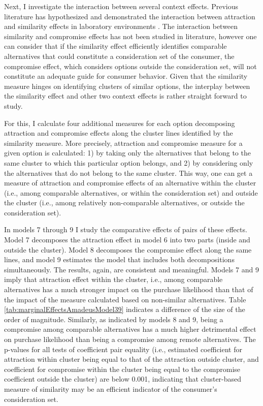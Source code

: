 \documentclass[a4paper,12pt]{article}
\begin{document}
Next, I investigate the interaction between several context effects. Previous literature has hypothesized and demonstrated the interaction between attraction and similarity effects in laboratory environments \citep{huberEtAl82, huberPuto83, roodrkerkEtAl11}. The interaction between similarity and compromise effects has not been studied in literature, however one can consider that if the similarity effect efficiently identifies comparable alternatives that could constitute a consideration set of the consumer, the compromise effect, which considers options outside the consideration set, will not constitute an adequate guide for consumer behavior.  Given that the similarity measure hinges on identifying clusters of similar options, the interplay between the similarity effect and other two context effects is rather straight forward to study. 

For this, I calculate four additional measures for each option decomposing attraction and compromise effects along the cluster lines identified by the similarity measure. More precisely, attraction and compromise measure for a given option is calculated: 1) by taking only the alternatives that belong to the same cluster to which this particular option belongs, and 2) by considering only the alternatives that do not belong to the same cluster. This way, one can get a measure of attraction and compromise effects of an alternative within the cluster (i.e., among comparable alternatives, or within the consideration set) and outside the cluster (i.e., among relatively non-comparable alternatives, or outside the consideration set).

In models 7 through 9 I study the comparative effects of pairs of these effects. Model 7 decomposes the attraction effect in model 6 into two parts (inside and outside the cluster).  Model 8 decomposes the compromise effect along the same lines, and model 9 estimates the model that includes both decompositions simultaneously. The results, again, are consistent and meaningful. Models 7 and 9 imply that attraction effect within the cluster, i.e., among comparable alternatives has a much stronger impact on the purchase likelihood than that of the impact of the measure calculated based on non-similar alternatives. Table \ref{tab:marginalEffectsAmadeusModel39} indicates a difference of the size of the order of magnitude. Similarly, as indicated by models 8 and 9, being a compromise among comparable alternatives has a much higher detrimental effect on purchase likelihood than being a compromise among remote alternatives. The p-values for all tests of coefficient pair equality (i.e., estimated coefficient for attraction within cluster being equal to that of the attraction outside cluster, and coefficient for compromise within the cluster being equal to the compromise coefficient outside the cluster) are below 0.001, indicating that cluster-based measure of similarity may be an efficient indicator of the consumer's consideration set.
\end{document}
